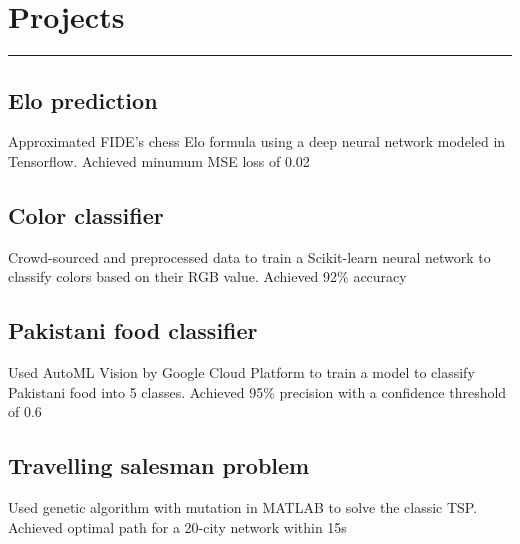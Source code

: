 \documentclass[a4paper, 11pt]{article}
\begin{document}
	
	\newpage
	\vspace{-12pt}
	\section*{Projects}
	\vspace{-6pt}
	\hrule
	\vspace{12pt}

	\subsection*{{Elo prediction} {\footnotesize{}}}
	\vspace{-6pt}
	Approximated FIDE's chess Elo formula using a deep neural network modeled in Tensorflow. Achieved minumum MSE loss of 0.02
	\vspace{-12pt}

	\subsection*{Color classifier}
	\vspace{-6pt}
	Crowd-sourced and preprocessed data to train a Scikit-learn neural network to classify colors based on their RGB value. Achieved 92\% accuracy
	\vspace{-12pt}

	\subsection*{Pakistani food classifier}
	\vspace{-6pt}
	Used AutoML Vision by Google Cloud Platform to train a model to classify Pakistani food into 5 classes. Achieved 95\% precision with a confidence threshold of 0.6
	\vspace{-12pt}
	
	\subsection*{Travelling salesman problem}
	\vspace{-6pt}
	Used genetic algorithm with mutation in MATLAB to solve the classic TSP. Achieved optimal path for a 20-city network within 15s

	
\end{document}

